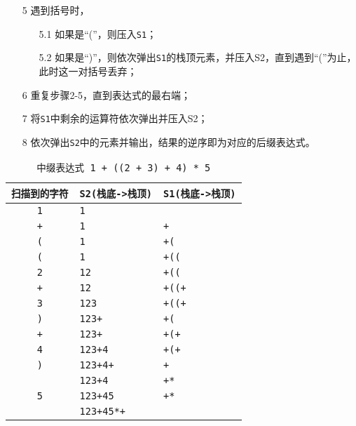 \begin{frame}
\begin{itemize}
\item[5] 遇到括号时，\\[0.1in]
\begin{itemize}
\item[5.1] 如果是“(”，则压入{\tt S1}；\\[0.1in]
\item[5.2] 如果是“)”，则依次弹出{\tt S1}的栈顶元素，并压入S2，直到遇到“(”为止，此时这一对括号丢弃；
\end{itemize}
\end{itemize}
\end{frame}

\begin{frame}
\begin{itemize}
\item[6] 重复步骤2-5，直到表达式的最右端；\\[0.1in]
\item[7] 将{\tt S1}中剩余的运算符依次弹出并压入S2；\\[0.1in]
\item[8] 依次弹出{\tt S2}中的元素并输出，结果的逆序即为对应的后缀表达式。
\end{itemize}
\end{frame}



\begin{frame}
\begin{scriptsize}
\begin{table}
\centering
\caption{{\tt 中缀表达式 1 + ((2 + 3) + 4) * 5}}
\begin{tabular}{|c|l|l|}\hline
{\tt 扫描到的字符} & {\tt S2(栈底->栈顶)} & {\tt S1(栈底->栈顶)} \\\hline
{\tt 1} &   {\tt 1} &         \\\hline 
{\tt +} &   {\tt 1} &  {\tt +}\\\hline 
{\tt (} &   {\tt 1} &  {\tt +(}\\\hline 
{\tt (} &   {\tt 1} &  {\tt +((}\\\hline 
{\tt 2} &   {\tt 12} &  {\tt +((}\\\hline 
{\tt +} &   {\tt 12} &  {\tt +((+}\\\hline 
{\tt 3} &   {\tt 123} &  {\tt +((+}\\\hline 
{\tt )} &   {\tt 123+} &  {\tt +(}\\\hline 
{\tt +} &   {\tt 123+} &  {\tt +(+}\\\hline 
{\tt 4} &   {\tt 123+4} &  {\tt +(+}\\\hline 
{\tt )} &   {\tt 123+4+} &  {\tt +}\\\hline 
{\tt *} &   {\tt 123+4} &  {\tt +*}\\\hline 
{\tt 5} &   {\tt 123+45} &  {\tt +*}\\\hline 
        &   {\tt 123+45*+} &  \\\hline 
\end{tabular}
\end{table}
\end{scriptsize}
\end{frame}


